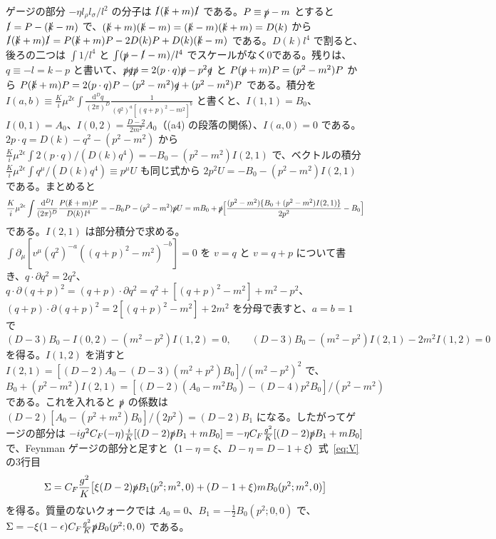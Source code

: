 \documentclass[a4paper,10pt]{ltjsarticle}
\newcommand{\dd}{\mathrm{d}}
\begin{document}
ゲージの部分 $-\eta l_\rho l_\sigma/l^2$ の分子は $\slashed l(\slashed k+m)\slashed l$ である。$P\equiv\slashed p-m$ とすると $\slashed l=P-(\slashed k-m)$ で、$(\slashed k+m)(\slashed k-m)=(\slashed k-m)(\slashed k+m)=D(k)$ から $\slashed l(\slashed k+m)\slashed l=P(\slashed k+m)P-2D(k)P+D(k)(\slashed k-m)$ である。$D(k)l^4$ で割ると、後ろの二つは $\int1/l^4$ と $\int(\slashed p-\slashed l-m)/l^4$ でスケールがなく0である。残りは、$q\equiv-l=k-p$ と書いて、$\slashed p\slashed q\slashed p=2(p\cdot q)\slashed p-p^2\slashed q$ と $P(\slashed p+m)P=(p^2-m^2)P$ から $P(\slashed k+m)P=2(p\cdot q)P-(p^2-m^2)\slashed q+(p^2-m^2)P$ である。積分を $I(a,b)\equiv\frac Ki\mu^{2\epsilon}\int\frac{\dd^Dq}{(2\pi)^D}\frac{1}{(q^2)^a[(q+p)^2-m^2]^b}$ と書くと、$I(1,1)=B_0$、$I(0,1)=A_0$、$I(0,2)=\frac{D-2}{2m^2}A_0$（(a4) の段落の関係）、$I(a,0)=0$ である。$2p\cdot q=D(k)-q^2-(p^2-m^2)$ から $\frac Ki\mu^{2\epsilon}\int2(p\cdot q)/(D(k)q^4)=-B_0-(p^2-m^2)I(2,1)$ で、ベクトルの積分 $\frac Ki\mu^{2\epsilon}\int q^\mu/(D(k)q^4)\equiv p^\mu U$ も同じ式から $2p^2U=-B_0-(p^2-m^2)I(2,1)$ である。まとめると
\begin{equation*}
\frac Ki\mu^{2\epsilon}\int\frac{\dd^Dl}{(2\pi)^D}\frac{P(\slashed k+m)P}{D(k)\,l^4}=-B_0P-(p^2-m^2)\slashed pU
=mB_0+\slashed p\Bigl[\frac{(p^2-m^2)\{B_0+(p^2-m^2)I(2,1)\}}{2p^2}-B_0\Bigr]
\end{equation*}
である。$I(2,1)$ は部分積分で求める。$\int\partial_\mu[v^\mu(q^2)^{-a}((q+p)^2-m^2)^{-b}]=0$ を $v=q$ と $v=q+p$ について書き、$q\cdot\partial q^2=2q^2$、$q\cdot\partial(q+p)^2=(q+p)\cdot\partial q^2=q^2+[(q+p)^2-m^2]+m^2-p^2$、$(q+p)\cdot\partial(q+p)^2=2[(q+p)^2-m^2]+2m^2$ を分母で表すと、$a=b=1$ で
\begin{equation*}
(D-3)B_0-I(0,2)-(m^2-p^2)I(1,2)=0,\qquad
(D-3)B_0-(m^2-p^2)I(2,1)-2m^2I(1,2)=0
\end{equation*}
を得る。$I(1,2)$ を消すと $I(2,1)=[(D-2)A_0-(D-3)(m^2+p^2)B_0]/(m^2-p^2)^2$ で、$B_0+(p^2-m^2)I(2,1)=[(D-2)(A_0-m^2B_0)-(D-4)p^2B_0]/(p^2-m^2)$ である。これを入れると $\slashed p$ の係数は $(D-2)[A_0-(p^2+m^2)B_0]/(2p^2)=(D-2)B_1$ になる。したがってゲージの部分は $-ig^2C_F(-\eta)\frac iK[(D-2)\slashed pB_1+mB_0]=-\eta C_F\frac{g^2}K[(D-2)\slashed pB_1+mB_0]$ で、Feynman ゲージの部分と足すと（$1-\eta=\xi$、$D-\eta=D-1+\xi$）式~\eqref{eq:V} の3行目
\begin{equation*}
\Sigma=C_F\frac{g^2}K\bigl[\xi(D-2)\slashed pB_1(p^2;m^2,0)+(D-1+\xi)mB_0(p^2;m^2,0)\bigr]
\end{equation*}
を得る。質量のないクォークでは $A_0=0$、$B_1=-\frac12B_0(p^2;0,0)$ で、$\Sigma=-\xi(1-\epsilon)C_F\frac{g^2}K\slashed pB_0(p^2;0,0)$ である。
\end{document}
